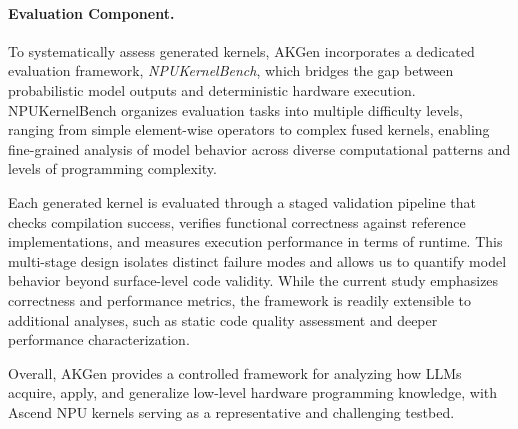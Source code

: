 \paragraph{Evaluation Component.}
To systematically assess generated kernels, AKGen incorporates a dedicated evaluation framework, \textit{NPUKernelBench}, which bridges the gap between probabilistic model outputs and deterministic hardware execution. NPUKernelBench organizes evaluation tasks into multiple difficulty levels, ranging from simple element-wise operators to complex fused kernels, enabling fine-grained analysis of model behavior across diverse computational patterns and levels of programming complexity.

Each generated kernel is evaluated through a staged validation pipeline that checks compilation success, verifies functional correctness against reference implementations, and measures execution performance in terms of runtime. This multi-stage design isolates distinct failure modes and allows us to quantify model behavior beyond surface-level code validity. While the current study emphasizes correctness and performance metrics, the framework is readily extensible to additional analyses, such as static code quality assessment and deeper performance characterization.

Overall, AKGen provides a controlled framework for analyzing how LLMs acquire, apply, and generalize low-level hardware programming knowledge, with Ascend NPU kernels serving as a representative and challenging testbed.
